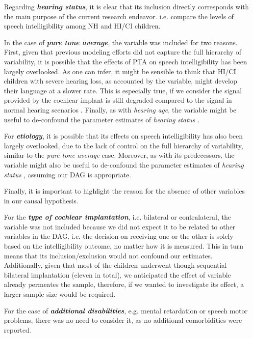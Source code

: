 Regarding \textbf{\textit{hearing status}}, it is clear that its inclusion directly corresponds with the main purpose of the current research endeavor. i.e. compare the levels of speech intelligibility among NH and HI/CI children.

In the case of \textbf{\textit{pure tone average}}, the variable was included for two reasons. First, given that previous modeling efforts did not capture the full hierarchy of variability, it is possible that the effects of PTA on speech intelligibility has been largely overlooked. As one can infer, it might be sensible to think that HI/CI children with severe hearing loss, as accounted by the variable, might develop their language at a slower rate. This is especially true, if we consider the signal provided by the cochlear implant is still degraded compared to the signal in normal hearing scenarios \cite{Drennan_et_al_2008}. Finally, as with \textit{hearing age}, the variable might be useful to de-confound the parameter estimates of \textit{hearing status} \cite{Cinelli_et_al_2021}.

For \textbf{\textit{etiology}}, it is possible that its effects on speech intelligibility has also been largely overlooked, due to the lack of control on the full hierarchy of variability, similar to the \textit{pure tone average} case. Moreover, as with its predecessors, the variable might also be useful to de-confound the parameter estimates of \textit{hearing status} \cite{Cinelli_et_al_2021}, assuming our DAG is appropriate.

Finally, it is important to highlight the reason for the absence of other variables in our causal hypothesis.

For the \textbf{\textit{type of cochlear implantation}}, i.e. bilateral or contralateral, the variable was not included because we did not expect it to be related to other variables in the DAG, i.e. the decision on receiving one or the other is solely based on the intelligibility outcome, no matter how it is measured. This in turn means that its inclusion/exclusion would not confound our estimates. Additionally, given that most of the children underwent though sequential bilateral implantation (eleven in total), we anticipated the effect of variable already permeates the sample, therefore, if we wanted to investigate its effect, a larger sample size would be required.

For the case of \textbf{\textit{additional disabilities}}, e.g. mental retardation or speech motor problems, there was no need to consider it, as no additional comorbidities were reported.

